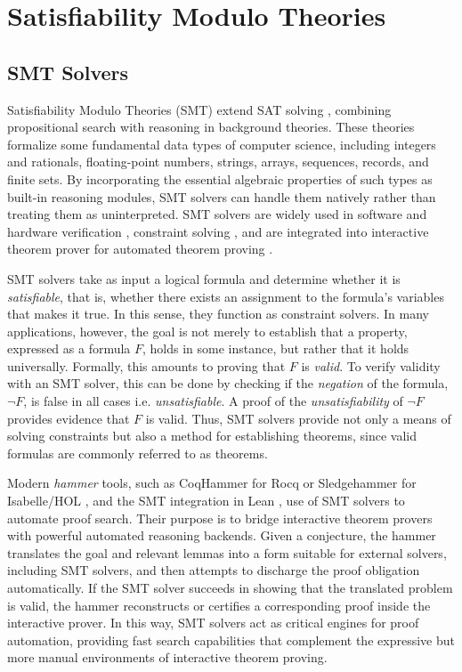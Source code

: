 \chapter{Satisfiability Modulo Theories}\label{ch:smt}


\section{SMT Solvers}

Satisfiability Modulo Theories (SMT) \cite{Barrett2021SatisfiabilityMT} extend SAT solving \cite{chaff,minitsat}, combining propositional search with reasoning in background theories.
These theories formalize some fundamental data types of computer science, including integers and rationals, floating-point numbers, strings, arrays, sequences, records, and finite sets.
By incorporating the essential algebraic properties of such types as built-in reasoning modules, SMT solvers can handle them natively rather than treating them as uninterpreted.
SMT solvers are widely used in software and hardware verification \cite{application-smt-hardware}, constraint solving \cite{awssmt,application-smt2}, and are integrated into interactive theorem prover for automated theorem proving \cite{coqhammer1,Sledgehammer, fstar,dafny, vyper}.

SMT solvers take as input a logical formula and determine whether it is \emph{satisfiable}, that is, whether there exists an assignment to the formula's variables that makes it true.
In this sense, they function as constraint solvers.
In many applications, however, the goal is not merely to establish that a property, expressed as a formula $F$, holds in some instance, but rather that it holds universally.
Formally, this amounts to proving that $F$ is \emph{valid}. To verify validity with an SMT solver, this can be done by checking
if the \emph{negation} of the formula, $\neg F$,  is false in all cases i.e. \emph{unsatisfiable}. A proof of the \emph{unsatisfiability} of $\neg F$ provides evidence that $F$ is valid.
Thus, SMT solvers provide not only a means of solving constraints but also a method for establishing theorems, since valid formulas are commonly referred to as theorems.

Modern \emph{hammer} tools, such as CoqHammer \cite{coqhammer1} for Rocq \cite{Rocq-refman} or Sledgehammer \cite{Sledgehammer} for Isabelle/HOL \cite{isabelle-hol-ref}, and the SMT integration in Lean \cite{lean-smt}, use of SMT solvers to automate proof search.
Their purpose is to bridge interactive theorem provers with powerful automated reasoning backends.
Given a conjecture, the hammer translates the goal and relevant lemmas into a form suitable for external solvers, including SMT solvers, and then attempts to discharge the proof obligation automatically.
If the SMT solver succeeds in showing that the translated problem is valid, the hammer reconstructs or certifies a corresponding proof inside the interactive prover.
In this way, SMT solvers act as critical engines for proof automation, providing fast search capabilities that complement the expressive but more manual environments of interactive theorem proving.

